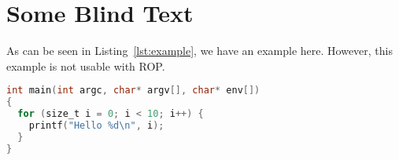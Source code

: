 \chapter{Some Blind Text}

\Blindtext

As can be seen in Listing~\ref{lst:example}, we have an example here. However,
this example is not usable with \gls{ROP}.

\begin{lstlisting}[language=C,label={lst:example},caption={Example C Code}]
int main(int argc, char* argv[], char* env[])
{
  for (size_t i = 0; i < 10; i++) {
    printf("Hello %d\n", i);
  }
}
\end{lstlisting}


\Blindtext
